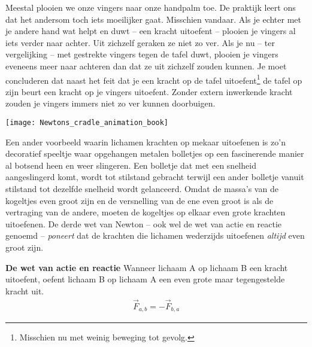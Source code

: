 \documentclass{ximera}
\begin{document}
	\author{Bart Lambregs}
    \xmsource


	Meestal plooien we onze vingers naar onze handpalm toe. De praktijk leert ons dat het andersom toch iets moeilijker gaat. Misschien vandaar. Als je echter met je andere hand wat helpt en duwt -- een kracht uitoefent -- plooien je vingers al iets verder naar achter. Uit zichzelf geraken ze niet zo ver. Als je nu -- ter vergelijking -- met gestrekte vingers tegen de tafel duwt, plooien je vingers eveneens meer naar achteren dan dat ze uit zichzelf zouden kunnen. Je moet concluderen dat naast het feit dat je een kracht op de tafel uitoefent\footnote{Misschien nu met weinig beweging tot gevolg.} de tafel op zijn beurt een kracht op je vingers uitoefent. Zonder extern inwerkende kracht zouden je vingers immers niet zo ver kunnen doorbuigen.

	\begin{image}
	\texttt{[image: Newtons\_cradle\_animation\_book]}
	\end{image}

	Een ander voorbeeld waarin lichamen krachten op mekaar uitoefenen is zo'n decoratief speeltje waar opgehangen metalen bolletjes op een fascinerende manier al botsend heen en weer slingeren. Een bolletje dat met een snelheid aangeslingerd komt, wordt tot stilstand gebracht terwijl een ander bolletje vanuit stilstand tot dezelfde snelheid wordt gelanceerd. Omdat de massa's van de kogeltjes even groot zijn en de versnelling van de ene even groot is als de vertraging van de andere, moeten de kogeltjes op elkaar even grote krachten uitoefenen. De derde wet van Newton -- ook wel de wet van actie en reactie genoemd -- \textit{poneert} dat de krachten die lichamen wederzijds uitoefenen \textit{altijd} even groot zijn.
	\begin{definition}
	{\textbf{De wet van actie en reactie}}
	Wanneer lichaam A op lichaam B een kracht uitoefent, oefent lichaam B op lichaam A een even grote maar tegengestelde kracht uit.
	\begin{eqnarray*}
	\vec{F}_{a,b}=-\vec{F}_{b,a}
	\end{eqnarray*}
	\end{definition}
	
\end{document}
